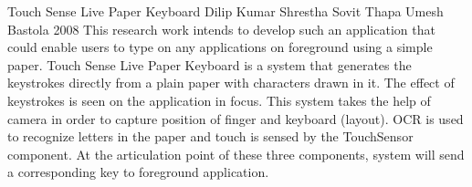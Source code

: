 \begin{conf-abstract}[]
{Touch Sense Live Paper Keyboard}
{ 
Dilip Kumar Shrestha
Sovit Thapa
Umesh Bastola
}
{2008}
This research work intends to develop such an application that could enable users to type on any applications on foreground using a simple paper. Touch Sense Live Paper Keyboard is a system that generates the keystrokes directly from a plain paper with characters drawn in it. The effect of keystrokes is seen on the application in focus. This system takes the help of camera in order to capture position of finger and keyboard (layout). OCR is used to  recognize letters in the paper and touch is sensed by the TouchSensor component. At the articulation point of these three components, system will send a corresponding key to foreground application.
\end{conf-abstract}